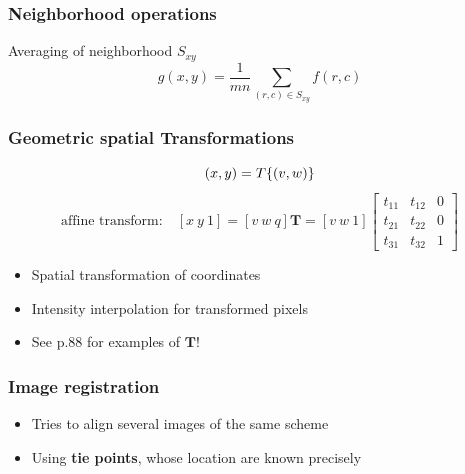 \subsubsection{Neighborhood operations }
Averaging of neighborhood $S_{xy}$
\begin{equation}
g(x,y) = \frac{1}{mn} \sum_{(r,c)\in S_{xy}}f(r,c)
\end{equation}

\subsubsection{Geometric spatial Transformations }
\begin{minipage}{0.6\textwidth}
  \[
  (x,y) = T\{(v,w)\} \notag \\
  \]
  \[
  \text{affine transform:} \quad \left[ x~y~1 \right] = [ v~w~q ] \mathbf{T} = [ v~w~1 ] 
  \left[ \begin{array}{ccc}
  t_{11} & t_{12} & 0 \\
  t_{21} & t_{22} & 0 \\
  t_{31} & t_{32} & 1 \end{array} \right]
  \]
\end{minipage}
\begin{minipage}{0.4\textwidth}
  \begin{itemize}
\item Spatial transformation of coordinates
\item Intensity interpolation for transformed pixels
\item See p.88 for examples of $\mathbf{T}$!
\end{itemize}
\end{minipage}

\subsubsection{Image registration }
\begin{itemize}
  \item Tries to align several images of the same scheme
  \item Using \textbf{tie points}, whose location are known precisely
\end{itemize}
